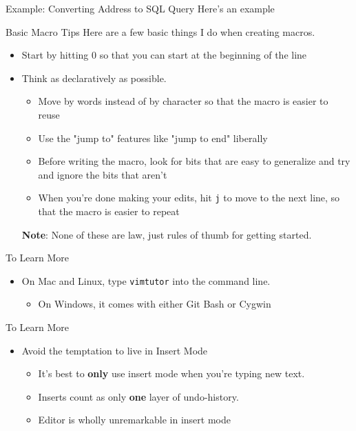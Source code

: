 \documentclass{beamer}
\begin{document}
\begin{frame}{Example: Converting Address to SQL Query}
	Here's an example 
\end{frame}
\begin{frame} {Basic Macro Tips}
	Here are a few basic things I do when creating macros. 
	\begin{itemize}
		\item Start by hitting 0 so that you can start at the beginning of the line
		\item Think as declaratively as possible.  \begin{itemize}
				\item Move by words instead of by character so that the macro is easier to reuse
				\item Use the "jump to" features like "jump to end" liberally
				\item Before writing the macro, look for bits that are easy to generalize and try and ignore the bits that aren't
				\item When you're done making your edits, hit \texttt{j} to move to the next line, so that the macro is easier to repeat
		\end{itemize}
			\textbf{Note}: None of these are law, just rules of thumb for getting started. 
	\end{itemize}
\end{frame}
\begin{frame} {To Learn More}
	\begin{itemize}
		\item On Mac and Linux, type \texttt{vimtutor} into the command line. \begin{itemize}
				\item On Windows, it comes with either Git Bash or Cygwin
	        \end{itemize}
	\end{itemize}
\end{frame}
\begin{frame} {To Learn More}
	\begin{itemize}

	\item Avoid the temptation to live in Insert Mode \begin{itemize}
			\item It's best to \textbf{only} use insert mode when you're typing new text. 
			\item Inserts count as only \textbf{one} layer of undo-history. 
			\item Editor is wholly unremarkable in insert mode
	\end{itemize}
	\end{itemize}
\end{frame}
\end{document}
